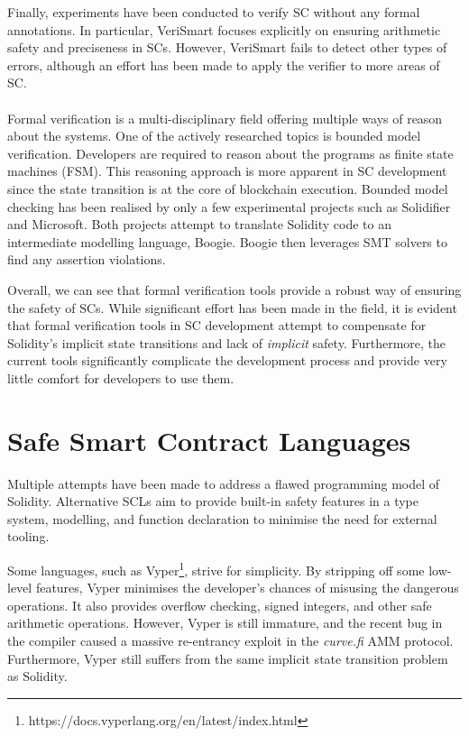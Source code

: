 \documentclass[oneside]{ecsproject}     %
\begin{document}
Finally, experiments have been conducted to verify SC without any formal annotations. 
In particular, VeriSmart focuses explicitly on ensuring arithmetic safety and preciseness in SCs\cite{so2019verismart}. 
However, VeriSmart fails to detect other types of errors, 
although an effort has been made to apply the verifier to more areas of SC.

\paragraph*{}
Formal verification is a multi-disciplinary field offering multiple ways of reason about the systems. One of the actively researched topics
is bounded model verification\cite{SMBC}. Developers are required to reason about the programs as finite state machines (FSM).
This reasoning approach is more apparent in SC development since the state transition is at the core of blockchain execution.
Bounded model checking has been realised by only a few experimental projects such as Solidifier\cite{solidifer} and Microsoft\cite{azure}.
Both projects attempt to translate Solidity code to an intermediate modelling language, Boogie\cite{boogie}. Boogie then leverages
SMT solvers to find any assertion violations.

Overall, we can see that formal verification tools provide a robust way of ensuring the safety of SCs. 
While significant effort has been made in the field, it is evident that formal verification tools in SC development
attempt to compensate for Solidity's implicit state transitions and lack of \textit{implicit} safety. 
Furthermore, the current tools significantly complicate the development process and provide very little comfort
for developers to use them.

\section{Safe Smart Contract Languages} \label{Chapter:SCL}

Multiple attempts have been made to address a flawed programming model of Solidity\cite{sc_survey}. Alternative SCLs aim to provide
built-in safety features in a type system, modelling, and function declaration to minimise the need for
external tooling. 

Some languages, such as Vyper\footnote{https://docs.vyperlang.org/en/latest/index.html}, strive for simplicity.
By stripping off some low-level features, Vyper minimises the developer's chances of misusing the dangerous operations.
It also provides overflow checking, signed integers, and other safe arithmetic operations. However, Vyper is still immature, 
and the recent bug in the compiler caused a massive re-entrancy exploit in the \textit{curve.fi} AMM protocol\cite{curve}.
Furthermore, Vyper still suffers from the same implicit state transition problem as Solidity.
\end{document}
